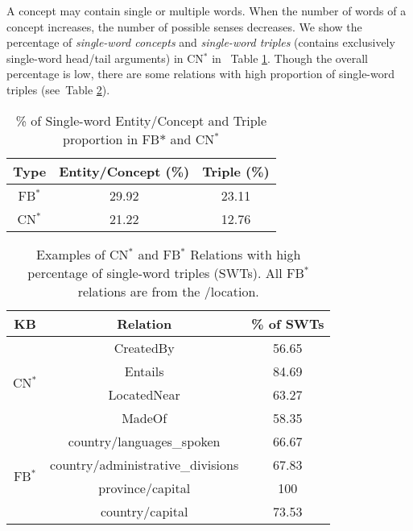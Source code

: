 \documentclass[11pt,a4paper]{article}
\newcommand{\tabref}[1]{Table \ref{#1}}
\begin{document}
A concept may contain single or multiple words. When the number of words of 
a concept increases, the number of possible senses decreases. 
We show the percentage of \textit{single-word concepts} and 
\textit{single-word triples} (contains exclusively single-word head/tail
arguments) in CN$^*$ in ~\tabref{tab:single-word-all}. 
Though the overall percentage is low, 
there are some relations with high proportion of single-word triples 
(see~\tabref{tab:single-word-some}). 

\begin{table}[!h]
	\small
	\centering
	\begin{tabular}{|c|c|c|}
		\hline
		\textbf{Type}        & \textbf{Entity/Concept (\%)} & \textbf{Triple (\%)} \\ \hline
		FB$^*$& 29.92              & 23.11       \\ \hline
		CN$^*$ & 21.22              & 12.76      \\ \hline
	\end{tabular}
	\caption{\% of Single-word Entity/Concept and Triple proportion in FB$*$ and CN$^*$}
	\label{tab:single-word-all}
\end{table}

\begin{table}[th]
	\centering
	\small
	\begin{tabular}{|c|c|c|}
		\hline
		\textbf{KB} & \textbf{Relation} & \textbf{\% of SWTs}\\ \hline
		\multirow{4}{*}{CN$^*$} &  CreatedBy                                   & 56.65                              \\ \cline{2-3} 
		& Entails                                     & 84.69                              \\ \cline{2-3} 
		& LocatedNear                                 & 63.27                              \\ \cline{2-3} 
		& MadeOf                                      & 58.35                              \\ \hline
		\multirow{4}{*}{FB$^*$} 
		
		& country/languages\_spoken         & 66.67 
		\\	\cline{2-3}		& country/administrative\_divisions & 67.83 
		\\	\cline{2-3}		& province/capital                  & 100          
		\\ 	\cline{2-3} & country/capital                   & 73.53\\
		\hline
	\end{tabular}
	\caption{Examples of CN$^*$ and FB$^*$ Relations with high percentage of
		single-word triples (SWTs). All FB$^*$ relations are from the /location.}
	\label{tab:single-word-some}
\end{table}
\end{document}
